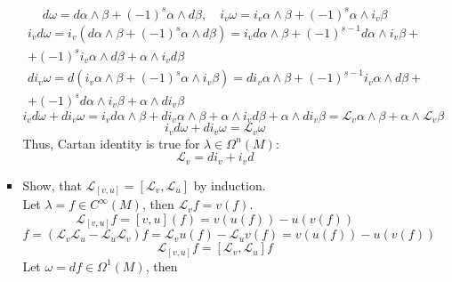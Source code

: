 \documentclass[12pt]{article}
\theoremstyle{definition}
\begin{document}
\begin{enumerate}
\begin{itemize}
\begin{itemize}
\begin{equation}
            d\omega=d\alpha\wedge\beta+(-1)^s\alpha\wedge d\beta,\quad i_v\omega=i_v\alpha\wedge\beta+(-1)^s\alpha\wedge i_v\beta
        \end{equation}
        \begin{multline}
            i_v d\omega=i_v(d\alpha\wedge\beta+(-1)^s\alpha\wedge d\beta)=i_vd\alpha\wedge\beta + (-1)^{s-1}d\alpha\wedge i_v \beta+\\+ (-1)^s i_v\alpha \wedge d\beta+\alpha \wedge i_vd\beta
        \end{multline}
        \begin{multline}
            di_v \omega=d(i_v\alpha\wedge\beta+(-1)^s\alpha\wedge i_v\beta)=di_v\alpha\wedge\beta+(-1)^{s-1}i_v\alpha\wedge d\beta+\\+(-1)^sd\alpha\wedge i_v\beta+\alpha\wedge di_v\beta
        \end{multline}
        \begin{equation}
            i_vd\omega+di_v\omega=i_vd\alpha\wedge\beta+di_v\alpha\wedge\beta+\alpha \wedge i_vd\beta+\alpha\wedge di_v\beta=\mathcal{L}_v\alpha\wedge\beta+\alpha\wedge\mathcal{L}_v\beta
        \end{equation}
        \begin{equation}
            i_vd\omega+di_v\omega=\mathcal{L}_v\omega
        \end{equation}
        Thus, Cartan identity is true for $\lambda\in\Omega^n(M)$:
        \begin{equation}
            \boxed{\mathcal{L}_v=di_v+i_vd}
        \end{equation}
        \item Show, that $\mathcal{L}_{[v,u]} = [\mathcal{L}_{v},\mathcal{L}_{u}]$ by induction.\\
        Let $\lambda=f\in C^\infty(M)$, then $\mathcal{L}_vf=v(f)$.
        \begin{equation}
            \mathcal{L}_{[v,u]}f=[v,u](f)=v(u(f))-u(v(f))
        \end{equation}
        \begin{equation}
            [\mathcal{L}_{v},\mathcal{L}_{u}]f=(\mathcal{L}_{v}\mathcal{L}_{u}-\mathcal{L}_{u}\mathcal{L}_{v})f=\mathcal{L}_vu(f)-\mathcal{L}_uv(f)=v(u(f))-u(v(f))
        \end{equation}
        \begin{equation}
            \mathcal{L}_{[v,u]}f=[\mathcal{L}_{v},\mathcal{L}_{u}]f
        \end{equation}
        Let $\omega=df\in\Omega^1(M)$, then

\end{itemize}
\end{itemize}
\end{enumerate}
\end{document}
